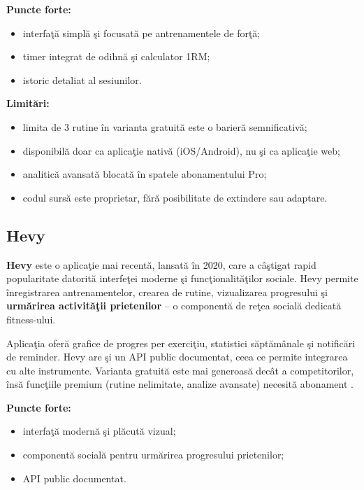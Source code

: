 \textbf{Puncte forte:}
\begin{itemize}
  \item interfa\c t\u a simpl\u a \c si focusat\u a pe antrenamentele de for\c t\u a;
  \item timer integrat de odihn\u a \c si calculator 1RM;
  \item istoric detaliat al sesiunilor.
\end{itemize}

\textbf{Limit\u ari:}
\begin{itemize}
  \item limita de 3 rutine \^ in varianta gratuit\u a este o barier\u a
        semnificativ\u a;
  \item disponibil\u a doar ca aplica\c tie nativ\u a (iOS/Android),
        nu \c si ca aplica\c tie web;
  \item analitic\u a avansat\u a blocat\u a \^ in spatele abonamentului Pro;
  \item codul surs\u a este proprietar, f\u ar\u a posibilitate de
        extindere sau adaptare.
\end{itemize}

\subsection{Hevy}

\textbf{Hevy} \cite{hevy2024} este o aplica\c tie mai recent\u a, lansat\u a
\^ in 2020, care a c\^ a\c stigat rapid popularitate datorit\u a interfe\c tei
moderne \c si func\c tionalit\u a\c tilor sociale. Hevy permite \^ inregistrarea
antrenamentelor, crearea de rutine, vizualizarea progresului \c si
\textbf{urm\u arirea activit\u a\c tii prietenilor} -- o component\u a de re\c tea
social\u a dedicat\u a fitness-ului.

Aplica\c tia ofer\u a grafice de progres per exerci\c tiu, statistici
s\u apt\u am\^ anale \c si notific\u ari de reminder. Hevy are \c si un API public
documentat, ceea ce permite integrarea cu alte instrumente. Varianta
gratuit\u a este mai generoas\u a dec\^ at a competitorilor, \^ ins\u a func\c tiile
premium (rutine nelimitate, analize avansate) necesit\u a abonament
\cite{hevy2024}.

\textbf{Puncte forte:}
\begin{itemize}
  \item interfa\c t\u a modern\u a \c si pl\u acut\u a vizual;
  \item component\u a social\u a pentru urm\u arirea progresului prietenilor;
  \item API public documentat.
\end{itemize}

